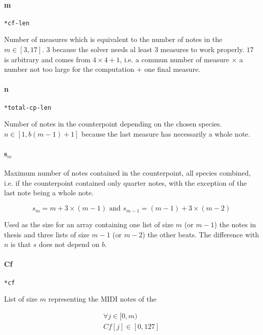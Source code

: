 \paragraph{m} \texttt{*cf-len}

Number of measures which is equivalent to the number of notes in the \cfdot $m \in [3, 17]$. $3$ because the solver needs al least 3 measures to work properly. $17$ is arbitrary and comes from $4\times 4 + 1$, i.e. a commun number of measure $\times$ a number not too large for the computation $+$ one final measure.

\paragraph{n} \texttt{*total-cp-len}

Number of notes in the counterpoint depending on the chosen species. $n \in [1, b(m-1)+1]$ because the last measure has necessarily a whole note.

\paragraph{s$_{m}$}

Maximum number of notes contained in the counterpoint, all species combined, i.e. if the counterpoint contained only quarter notes, with the exception of the last note being a whole note.

\begin{equation}
    s_{m} = m + 3\times (m-1) \text{ and }s_{m-1} = (m-1) + 3\times (m-2)
\end{equation}

Used as the size for an array containing one list of size $m$ (or $m-1$) the notes in thesis and three lists of size $m-1$ (or $m-2$) the other beats. The difference with $n$ is that $s$ does not depend on $b$.

\paragraph{Cf} \texttt{*cf}

List of size $m$ representing the MIDI notes of the \cfdot

\begin{equation}
    \begin{gathered}
        \forall j \in [0, m)\\
        Cf[j] \in [0, 127]
    \end{gathered}
\end{equation}


